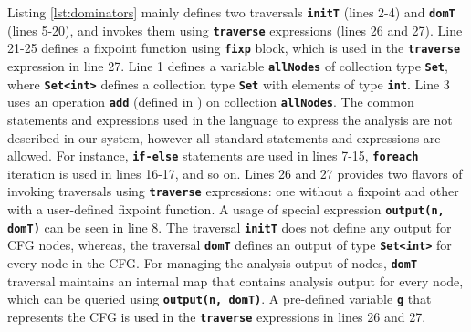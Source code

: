 Listing \ref{lst:dominators} mainly defines two traversals \textbf{\lstinline|initT|}
(lines 2-4) and \textbf{\lstinline|domT|} (lines 5-20), and invokes them using
\textbf{\lstinline|traverse|} expressions (lines 26 and 27). Line 21-25 defines a
fixpoint function using \textbf{\lstinline|fixp|} block, which is used in the
\textbf{\lstinline|traverse|} expression in line 27. Line 1 defines a variable
\textbf{\lstinline|allNodes|} of collection type \textbf{\lstinline|Set|}, where
\textbf{\lstinline|Set<int>|} defines a collection type \textbf{\lstinline|Set|} with elements of
type \textbf{\lstinline|int|}. Line 3 uses an operation \textbf{\lstinline|add|} (defined in
) on collection \textbf{\lstinline|allNodes|}. The common
statements and expressions used in the language to express the analysis are not
described in our system, however all standard statements and expressions are
allowed.
For instance, \textbf{\lstinline|if-else|} statements are used in lines 7-15,
\textbf{\lstinline|foreach|} iteration is used in lines 16-17, and so on.
Lines 26 and 27 provides two flavors of invoking traversals using
\textbf{\lstinline|traverse|} expressions: one without a fixpoint and other with a
user-defined fixpoint function. A usage of special expression
\textbf{\lstinline|output(n, domT)|} can be seen in line 8. The traversal
\textbf{\lstinline|initT|} does not define any output for CFG nodes, whereas, the
traversal \textbf{\lstinline|domT|} defines an output of type \textbf{\lstinline|Set<int>|} for
every node in the CFG. For managing the analysis output of nodes,
\textbf{\lstinline|domT|} traversal maintains an internal map that contains analysis
output for every node, which can be queried using \textbf{\lstinline|output(n, domT)|}.
A pre-defined variable \textbf{\lstinline|g|} that represents the CFG is used in the
\textbf{\lstinline|traverse|} expressions in lines 26 and 27.

